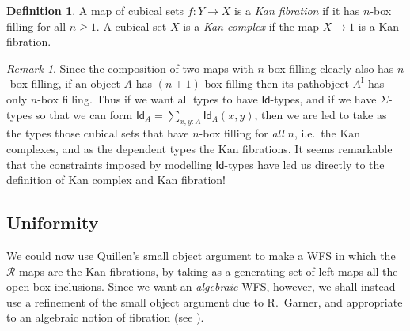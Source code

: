 \documentclass[12pt]{article}
\newcommand{\R}{\ensuremath{\mathcal{R}}}
\newcommand{\I}{\ensuremath{\mathrm{I}}}
\newcommand{\Id}{\ensuremath{\mathsf{Id}}}
\newcommand{\id}[1]{\Id_{#1}}
\theoremstyle{remark}
\newtheorem{remark}[theorem]{Remark}
\theoremstyle{definition}
\newtheorem{definition}[theorem]{Definition}
\begin{document}
\begin{definition}
A map of cubical sets $f : Y\to X$ is a \emph{Kan fibration} if it has $n$-box filling for all $n\geq 1$.  
A cubical set $X$ is a \emph{Kan complex} if the map $X\to 1$ is a Kan fibration.  
\end{definition}

\begin{remark}
Since the composition of two maps with $n$-box filling clearly also has $n$-box filling, if an object $A$ has $(n+1)$-box filling then its pathobject $A^\I$ has only $n$-box filling.  Thus if we want all types to have \Id-types, and if we have $\Sigma$-types so that we can form $\id{A} = \sum_{x,y:A}\id{A}(x,y)$,  then we are led to take as the types those cubical sets that have $n$-box filling for \emph{all} $n$, i.e.\ the Kan complexes, and as the dependent types the Kan fibrations.  It seems remarkable that the constraints imposed by modelling \Id-types have led us directly to the definition of Kan complex and Kan fibration!
\end{remark}

\subsection{Uniformity}

We could now use Quillen's small object argument to make a WFS in which the \R-maps are the Kan fibrations, by taking as a generating set of left maps all the open box inclusions.  Since we want an \emph{algebraic} WFS, however, we shall instead use a refinement of the small object argument due to R.~Garner, and appropriate to an algebraic notion of fibration (see \cite{Garner}).
\end{document}
